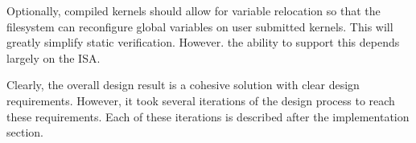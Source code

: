 Optionally, compiled kernels should allow for variable relocation so that the
filesystem can reconfigure global variables on user submitted kernels. This
will greatly simplify static verification. However. the ability to support this
depends largely on the ISA.

Clearly, the overall design result is a cohesive solution with clear design
requirements. However, it took several iterations of the design process to
reach these requirements. Each of these iterations is described after the
implementation section.

